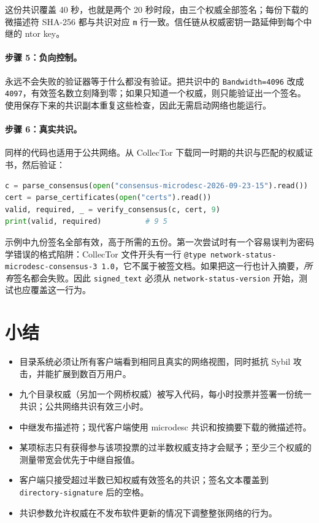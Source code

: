 这份共识覆盖 40 秒，也就是两个 20 秒时段，由三个权威全部签名；每份下载的微描述符 SHA-256 都与共识对应 \texttt{m} 行一致。信任链从权威密钥一路延伸到每个中继的 ntor key。

\paragraph{步骤 5：负向控制。} 永远不会失败的验证器等于什么都没有验证。把共识中的 \texttt{Bandwidth=4096} 改成 \texttt{4097}，有效签名数立刻降到零；如果只知道一个权威，则只能验证出一个签名。 使用保存下来的共识副本重复这些检查，因此无需启动网络也能运行。

\paragraph{步骤 6：真实共识。} 同样的代码也适用于公共网络。从 CollecTor 下载同一时期的共识与匹配的权威证书，然后验证：

\begin{lstlisting}[language=Python,numbers=none]
c = parse_consensus(open("consensus-microdesc-2026-09-23-15").read())
cert = parse_certificates(open("certs").read())
valid, required, _ = verify_consensus(c, cert, 9)
print(valid, required)          # 9 5
\end{lstlisting}

示例中九份签名全部有效，高于所需的五份。第一次尝试时有一个容易误判为密码学错误的格式陷阱：CollecTor 文件开头有一行 \texttt{@type network-status-microdesc-consensus-3 1.0}，它不属于被签文档。如果把这一行也计入摘要，\emph{所有}签名都会失败。因此 \texttt{signed\_text} 必须从 \texttt{network-status-version} 开始，测试也应覆盖这一行为。

\section*{小结}
\begin{itemize}
  \item 目录系统必须让所有客户端看到相同且真实的网络视图，同时抵抗 Sybil 攻击，并能扩展到数百万用户。
  \item 九个目录权威（另加一个网桥权威）被写入代码，每小时投票并签署一份统一共识；公共网络共识有效三小时。
  \item 中继发布描述符；现代客户端使用 microdesc 共识和按摘要下载的微描述符。
  \item 某项标志只有获得参与该项投票的过半数权威支持才会赋予；至少三个权威的测量带宽会优先于中继自报值。
  \item 客户端只接受超过半数已知权威有效签名的共识；签名文本覆盖到 \texttt{directory-signature} 后的空格。
  \item 共识参数允许权威在不发布软件更新的情况下调整整张网络的行为。
\end{itemize}

